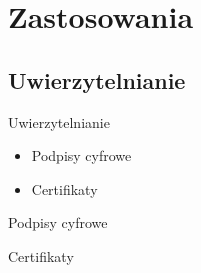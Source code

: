 \section{Zastosowania}

\subsection{Uwierzytelnianie}
\begin{frame}{Uwierzytelnianie}
    \begin{itemize}
        \pause
        \item Podpisy cyfrowe
        \pause
        \item Certifikaty
    \end{itemize}
\end{frame}

\begin{frame}{Podpisy cyfrowe}
    
\end{frame}

\begin{frame}{Certifikaty}

\end{frame}
